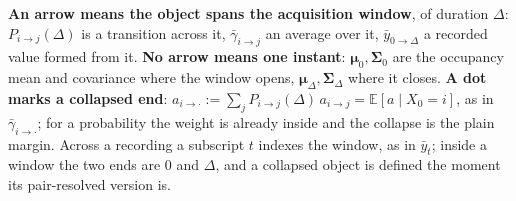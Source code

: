 \begin{appendixbox}
\begin{tcolorbox}[title={Three marks, and each one says one thing}, colback=gray!5, colframe=gray!55]
\textbf{An arrow means the object spans the acquisition window}, of duration $\Delta$:
$P_{i\to j}(\Delta)$ is a transition across it, $\bar\gamma_{i\to j}$ an average over it,
$\bar y_{0\to\Delta}$ a recorded value formed from it. \textbf{No arrow means one instant}:
$\boldsymbol{\mu}_0,\boldsymbol{\Sigma}_0$ are the occupancy mean and covariance where the window opens,
$\boldsymbol{\mu}_\Delta,\boldsymbol{\Sigma}_\Delta$ where it closes. \textbf{A dot marks a collapsed end}:
$a_{i\to\cdot}:=\sum_j P_{i\to j}(\Delta)\,a_{i\to j}=\mathbb{E}[a\mid X_0=i]$, as in
$\bar\gamma_{i\to\cdot}$; for a probability the weight is already inside and the collapse is the
plain margin. Across a recording a subscript $t$ indexes the window, as in $\bar y_t$; inside a window the two
ends are $0$ and $\Delta$, and a collapsed object is defined the moment its pair-resolved version is.
\end{tcolorbox}


\end{appendixbox}
